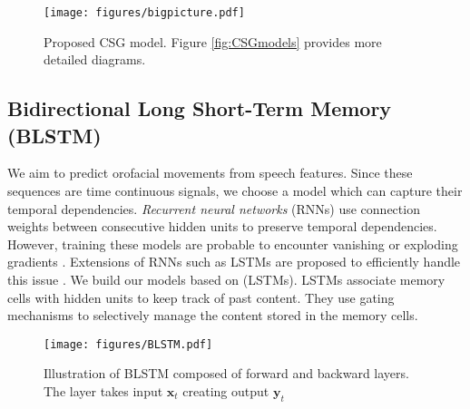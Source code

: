 \documentclass[10pt,journal,compsoc]{IEEEtran}
\begin{document}


\begin{figure}[t]
	\centering
	\texttt{[image: figures/bigpicture.pdf]}
	\caption{Proposed CSG model. Figure \ref{fig:CSGmodels} provides more detailed diagrams.}
	\label{fig:bigpic}
\end{figure}

\subsection{Bidirectional Long Short-Term Memory (BLSTM)}
\label{ssec:lstm}

We aim to predict orofacial movements from speech features. Since these sequences are time continuous signals, we  choose a model which can capture their temporal dependencies. \emph{Recurrent neural networks} (RNNs) use connection weights between consecutive hidden units to preserve temporal dependencies. However, training these models are probable to encounter  vanishing or exploding gradients \cite{Hochreiter_1997}. Extensions of RNNs such as LSTMs are proposed to efficiently handle this issue \cite{Hochreiter_1997}. We build our models based on (LSTMs). LSTMs associate memory cells with hidden units to keep track of past content. They use gating mechanisms to selectively manage the content stored in the memory cells. 

\begin{figure}
	\centering
	\texttt{[image: figures/BLSTM.pdf]}
	\caption{Illustration of BLSTM composed of forward and backward layers. The layer takes input $\mathbf{x}_t$ creating output $\mathbf{y}_t$}
	\label{fig:blstm}
\end{figure}
\end{document}
